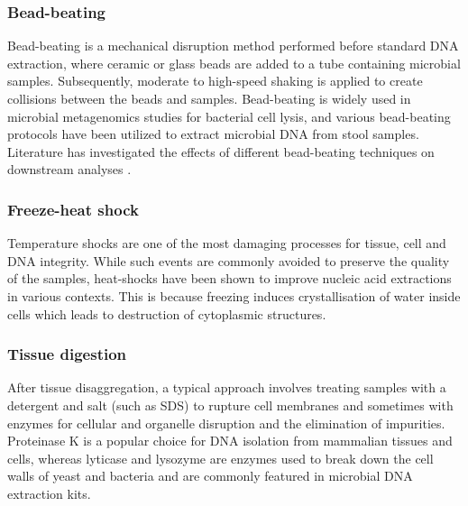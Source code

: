 \documentclass[
]{book}
\begin{document}
\hypertarget{bead-beating}{%
\subsubsection*{Bead-beating}\label{bead-beating}}

Bead-beating is a mechanical disruption method performed before standard DNA extraction, where ceramic or glass beads are added to a tube containing microbial samples. Subsequently, moderate to high-speed shaking is applied to create collisions between the beads and samples. Bead-beating is widely used in microbial metagenomics studies for bacterial cell lysis, and various bead-beating protocols have been utilized to extract microbial DNA from stool samples. Literature has investigated the effects of different bead-beating techniques on downstream analyses \citep[\citet{Fiedorova2019-yk}]{Zhang2021-sn}.

\hypertarget{freeze-heat-shock}{%
\subsubsection*{Freeze-heat shock}\label{freeze-heat-shock}}

Temperature shocks are one of the most damaging processes for tissue, cell and DNA integrity. While such events are commonly avoided to preserve the quality of the samples, heat-shocks have been shown to improve nucleic acid extractions in various contexts. This is because freezing induces crystallisation of water inside cells which leads to destruction of cytoplasmic structures.

\hypertarget{tissue-digestion}{%
\subsubsection*{Tissue digestion}\label{tissue-digestion}}

After tissue disaggregation, a typical approach involves treating samples with a detergent and salt (such as SDS) to rupture cell membranes and sometimes with enzymes for cellular and organelle disruption and the elimination of impurities. Proteinase K is a popular choice for DNA isolation from mammalian tissues and cells, whereas lyticase and lysozyme are enzymes used to break down the cell walls of yeast and bacteria and are commonly featured in microbial DNA extraction kits.
\end{document}
